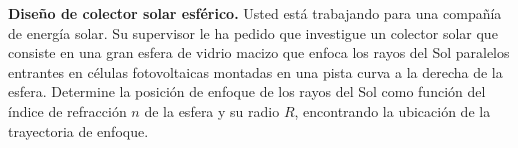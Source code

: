 \item \textbf{Diseño de colector solar esférico.}
Usted está trabajando para una compañía de energía solar. Su supervisor le ha pedido que investigue un colector solar que consiste en una gran esfera de vidrio macizo que enfoca los rayos del Sol paralelos entrantes en células fotovoltaicas montadas en una pista curva a la derecha de la esfera. Determine la posición de enfoque de los rayos del Sol como función del índice de refracción $n$ de la esfera y su radio $R$, encontrando la ubicación de la trayectoria de enfoque.